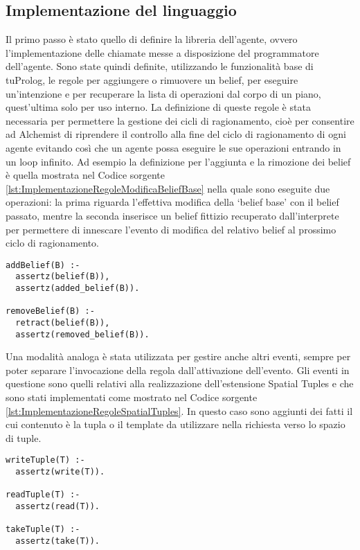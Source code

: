 \subsection{Implementazione del linguaggio}
Il primo passo è stato quello di definire la libreria dell'agente, ovvero l'implementazione delle chiamate messe a disposizione del programmatore dell'agente. Sono state quindi definite, utilizzando le funzionalità base di tuProlog, le regole per aggiungere o rimuovere un belief, per eseguire un'intenzione e per recuperare la lista di operazioni dal corpo di un piano, quest'ultima solo per uso interno.
La definizione di queste regole è stata necessaria per permettere la gestione dei cicli di ragionamento, cioè per consentire ad Alchemist di riprendere il controllo alla fine del ciclo di ragionamento di ogni agente evitando così che un agente possa eseguire le sue operazioni entrando in un loop infinito.
Ad esempio la definizione per l'aggiunta e la rimozione dei belief è quella mostrata nel Codice sorgente \ref{lst:ImplementazioneRegoleModificaBeliefBase} nella quale sono eseguite due operazioni: la prima riguarda l'effettiva modifica della `belief base' con il belief passato, mentre la seconda inserisce un belief fittizio recuperato dall'interprete per permettere di innescare l'evento di modifica del relativo belief al prossimo ciclo di ragionamento.

\medskip
\begin{lstlisting}[firstnumber=1,label={lst:ImplementazioneRegoleModificaBeliefBase},caption={Implementazione regole modifica della `belief base'}]
addBelief(B) :-
  assertz(belief(B)),
  assertz(added_belief(B)).

removeBelief(B) :-
  retract(belief(B)),
  assertz(removed_belief(B)).
\end{lstlisting}

Una modalità analoga è stata utilizzata per gestire anche altri eventi, sempre per poter separare l'invocazione della regola dall'attivazione dell'evento. Gli eventi in questione sono quelli relativi alla realizzazione dell'estensione Spatial Tuples e che sono stati implementati come mostrato nel Codice sorgente \ref{lst:ImplementazioneRegoleSpatialTuples}. In questo caso sono aggiunti dei fatti il cui contenuto è la tupla o il template da utilizzare nella richiesta verso lo spazio di tuple.

\medskip
\begin{lstlisting}[firstnumber=1,label={lst:ImplementazioneRegoleSpatialTuples},caption={Implementazione regole estensione Spatial Tuples}]
writeTuple(T) :-
  assertz(write(T)).

readTuple(T) :-
  assertz(read(T)).

takeTuple(T) :-
  assertz(take(T)).
\end{lstlisting}

